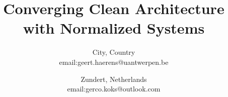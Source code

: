 \title{\bfseries\Large Converging Clean Architecture with Normalized Systems}

\author{
City, Country \\
email:geert.haerens@uantwerpen.be
\and
{}
Zundert, Netherlands \\
email:gerco.koks@outlook.com}

\maketitle